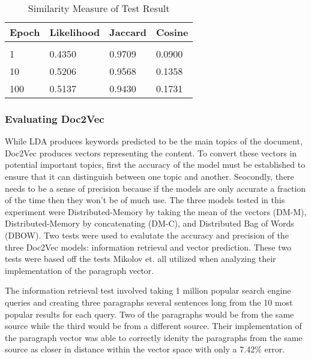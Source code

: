 \begin{table}[!htbp]
\caption{Similarity Measure of Test Result}
\label{lda-jc}
\begin{center}
\begin{tabular}{  l  l l l}
\bf Epoch & \bf Likelihood & \bf Jaccard & \bf Cosine \\ \hline \\
1         &0.4350 & 0.9709 & 0.0900\\
10       &0.5206 & 0.9568 & 0.1358\\
100     &0.5137 &  0.9430 & 0.1731\\
\end{tabular}
\end{center}
\end{table}

\subsubsection{Evaluating Doc2Vec}
While LDA produces keywords predicted to be the main topics of the document, Doc2Vec produces vectors representing the content. To convert these vectors in potential important topics, first the accuracy of the model must be established to ensure that it can distinguish between one topic and another. Seocondly, there needs to be a sense of precision because if the models are only accurate a fraction of the time then they won't be of much use. The three models tested in this experiment were  Distributed-Memory by taking the mean of the vectors (DM-M), Distributed-Memory by concatenating (DM-C), and Distributed Bag of Words (DBOW). Two tests were used to evalutate the accuracy and precision of the three Doc2Vec models: information retrieval and vector prediction. These two tests were based off the tests Mikolov et. all utilized when analyzing their implementation of the paragraph vector. \cite{RefWorks:doc:5a6e5746e4b0d609eec798d7}

The information retrieval test involved taking 1 million popular search engine queries and creating three paragraphs several sentences long from the 10 most popular results for each query. Two of the paragraphs would be from the same source while the third would be from a different source. Their implementation of the paragraph vector was able to correctly idenity the paragraphs from the same source as closer in distance within the vector space with only a 7.42\% error. 


